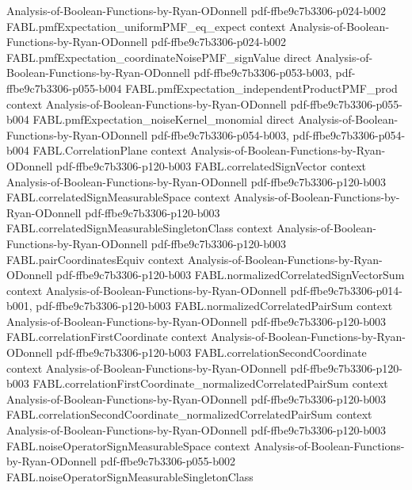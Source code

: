 \begin{theorem}
  {Analysis-of-Boolean-Functions-by-Ryan-ODonnell}
  {pdf-ffbe9c7b3306-p024-b002}
\proofstep
  {FABL.pmfExpectation_uniformPMF_eq_expect}
  {context}
  {Analysis-of-Boolean-Functions-by-Ryan-ODonnell}
  {pdf-ffbe9c7b3306-p024-b002}
\proofstep
  {FABL.pmfExpectation_coordinateNoisePMF_signValue}
  {direct}
  {Analysis-of-Boolean-Functions-by-Ryan-ODonnell}
  {pdf-ffbe9c7b3306-p053-b003,
    pdf-ffbe9c7b3306-p055-b004}
\proofstep
  {FABL.pmfExpectation_independentProductPMF_prod}
  {context}
  {Analysis-of-Boolean-Functions-by-Ryan-ODonnell}
  {pdf-ffbe9c7b3306-p055-b004}
\proofstep
  {FABL.pmfExpectation_noiseKernel_monomial}
  {direct}
  {Analysis-of-Boolean-Functions-by-Ryan-ODonnell}
  {pdf-ffbe9c7b3306-p054-b003,
    pdf-ffbe9c7b3306-p054-b004}
\proofstep
  {FABL.CorrelationPlane}
  {context}
  {Analysis-of-Boolean-Functions-by-Ryan-ODonnell}
  {pdf-ffbe9c7b3306-p120-b003}
\proofstep
  {FABL.correlatedSignVector}
  {context}
  {Analysis-of-Boolean-Functions-by-Ryan-ODonnell}
  {pdf-ffbe9c7b3306-p120-b003}
\proofstep
  {FABL.correlatedSignMeasurableSpace}
  {context}
  {Analysis-of-Boolean-Functions-by-Ryan-ODonnell}
  {pdf-ffbe9c7b3306-p120-b003}
\proofstep
  {FABL.correlatedSignMeasurableSingletonClass}
  {context}
  {Analysis-of-Boolean-Functions-by-Ryan-ODonnell}
  {pdf-ffbe9c7b3306-p120-b003}
\proofstep
  {FABL.pairCoordinatesEquiv}
  {context}
  {Analysis-of-Boolean-Functions-by-Ryan-ODonnell}
  {pdf-ffbe9c7b3306-p120-b003}
\proofstep
  {FABL.normalizedCorrelatedSignVectorSum}
  {context}
  {Analysis-of-Boolean-Functions-by-Ryan-ODonnell}
  {pdf-ffbe9c7b3306-p014-b001,
    pdf-ffbe9c7b3306-p120-b003}
\proofstep
  {FABL.normalizedCorrelatedPairSum}
  {context}
  {Analysis-of-Boolean-Functions-by-Ryan-ODonnell}
  {pdf-ffbe9c7b3306-p120-b003}
\proofstep
  {FABL.correlationFirstCoordinate}
  {context}
  {Analysis-of-Boolean-Functions-by-Ryan-ODonnell}
  {pdf-ffbe9c7b3306-p120-b003}
\proofstep
  {FABL.correlationSecondCoordinate}
  {context}
  {Analysis-of-Boolean-Functions-by-Ryan-ODonnell}
  {pdf-ffbe9c7b3306-p120-b003}
\proofstep
  {FABL.correlationFirstCoordinate_normalizedCorrelatedPairSum}
  {context}
  {Analysis-of-Boolean-Functions-by-Ryan-ODonnell}
  {pdf-ffbe9c7b3306-p120-b003}
\proofstep
  {FABL.correlationSecondCoordinate_normalizedCorrelatedPairSum}
  {context}
  {Analysis-of-Boolean-Functions-by-Ryan-ODonnell}
  {pdf-ffbe9c7b3306-p120-b003}
\proofstep
  {FABL.noiseOperatorSignMeasurableSpace}
  {context}
  {Analysis-of-Boolean-Functions-by-Ryan-ODonnell}
  {pdf-ffbe9c7b3306-p055-b002}
\proofstep
  {FABL.noiseOperatorSignMeasurableSingletonClass}

\end{theorem}
